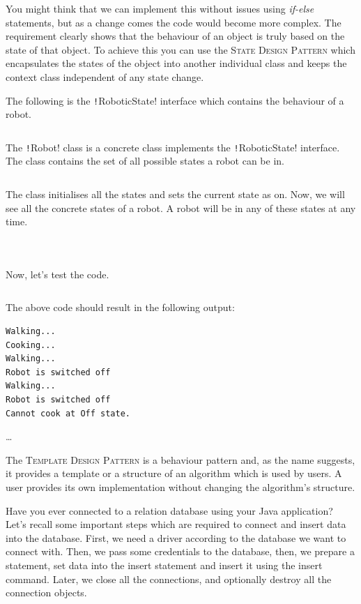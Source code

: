 \documentclass[12pt,a4paper,answers]{exam}
\newcommand{\code}{/Users/keith/Documents/Courses/sdp/repo/worksheets/dp-five/scala/src}
\begin{document}
\begin{questions}
You might think that we can implement this without issues using \emph{if-else} statements, but as 
a change comes the code would become more complex. 
The requirement clearly shows that the behaviour of an object is truly based on the state of that 
object. 
To achieve this you can use the \textsc{State Design Pattern} which encapsulates the states of 
the object into another individual class and keeps the context class independent of any state 
change.

The following is the \texttt!RoboticState! interface which contains the behaviour of a 
robot.
\inputminted[]{scala}{\code/state/RoboticState.scala}
The \texttt!Robot! class is a concrete class implements the 
\texttt!RoboticState! interface. 
The class contains the set of all possible states a robot can be in.
\inputminted[]{scala}{\code/state/Robot.scala}
The class initialises all the states and sets the current state as on.
Now, we will see all the concrete states of a robot. 
A robot will be in any of these states at any time.
\inputminted{scala}{\code/state/RoboticOn.scala}
\inputminted{scala}{\code/state/RoboticCook.scala}
\inputminted{scala}{\code/state/RoboticOff.scala}
Now, let's test the code.
\inputminted{scala}{\code/state/TestStatePattern.scala}
The above code should result in the following output:
\begin{Verbatim}
Walking...
Cooking...
Walking...
Robot is switched off
Walking...
Robot is switched off
Cannot cook at Off state.	
\end{Verbatim}

\begin{solution}
	\ldots
\end{solution}

\question
The \textsc{Template Design Pattern} is a behaviour pattern and, as the name suggests, 
it provides a template or a structure of an algorithm which is used by users. 
A user provides its own implementation without changing the algorithm's structure.

Have you ever connected to a relation database using your Java application? 
Let's recall some important steps which are required to connect and insert data into 
the database. First, we need a driver according to the database we want to connect with. 
Then, we pass some credentials to the database, then, we prepare a statement, set data into the 
insert statement and insert it using the insert command. Later, we close all the connections, and 
optionally destroy all the connection objects.


\end{questions}
\end{document}
